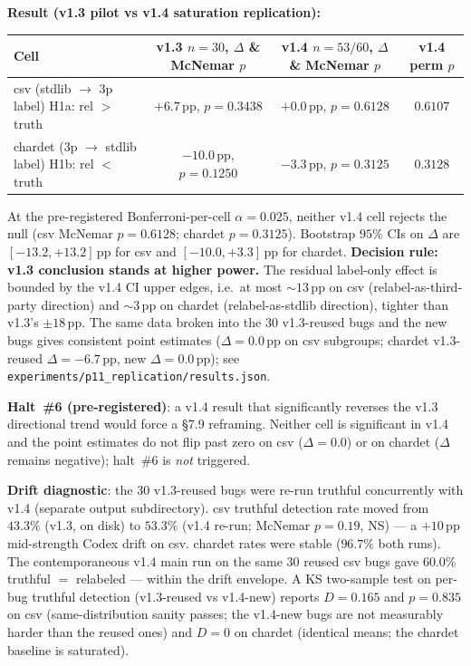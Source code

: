 \textbf{Result (v1.3 pilot vs v1.4 saturation replication):}

\begin{center}
\small
\begin{tabular}{@{}lccc@{}}
\toprule
Cell & v1.3 $n=30$, $\Delta$ \& McNemar $p$ & v1.4 $n=53/60$, $\Delta$ \& McNemar $p$ & v1.4 perm $p$ \\
\midrule
csv (stdlib $\to$ 3p label) H1a: rel $>$ truth & $+6.7\,\mathrm{pp}$, $p=0.3438$ & $+0.0\,\mathrm{pp}$, $p=0.6128$ & $0.6107$ \\
chardet (3p $\to$ stdlib label) H1b: rel $<$ truth & $-10.0\,\mathrm{pp}$, $p=0.1250$ & $-3.3\,\mathrm{pp}$, $p=0.3125$ & $0.3128$ \\
\bottomrule
\end{tabular}
\end{center}

At the pre-registered Bonferroni-per-cell $\alpha=0.025$, neither v1.4 cell rejects the null (csv McNemar $p=0.6128$; chardet $p=0.3125$). Bootstrap $95\%$ CIs on $\Delta$ are $[-13.2, +13.2]\,\mathrm{pp}$ for csv and $[-10.0, +3.3]\,\mathrm{pp}$ for chardet. \textbf{Decision rule: v1.3 conclusion stands at higher power.} The residual label-only effect is bounded by the v1.4 CI upper edges, i.e.\ at most $\sim 13\,\mathrm{pp}$ on csv (relabel-as-third-party direction) and $\sim 3\,\mathrm{pp}$ on chardet (relabel-as-stdlib direction), tighter than v1.3's $\pm 18\,\mathrm{pp}$. The same data broken into the $30$ v1.3-reused bugs and the new bugs gives consistent point estimates ($\Delta=0.0\,\mathrm{pp}$ on csv subgroups; chardet v1.3-reused $\Delta=-6.7\,\mathrm{pp}$, new $\Delta=0.0\,\mathrm{pp}$); see \texttt{experiments/p11\_replication/results.json}.

\textbf{Halt~\#6 (pre-registered)}: a v1.4 result that significantly reverses the v1.3 directional trend would force a §7.9 reframing. Neither cell is significant in v1.4 and the point estimates do not flip past zero on csv ($\Delta = 0.0$) or on chardet ($\Delta$ remains negative); halt~\#6 is \emph{not} triggered.

\textbf{Drift diagnostic}: the 30 v1.3-reused bugs were re-run truthful concurrently with v1.4 (separate output subdirectory). csv truthful detection rate moved from $43.3\%$ (v1.3, on disk) to $53.3\%$ (v1.4 re-run; McNemar $p=0.19$, NS) — a $+10\,\mathrm{pp}$ mid-strength Codex drift on csv. chardet rates were stable ($96.7\%$ both runs). The contemporaneous v1.4 main run on the same 30 reused csv bugs gave $60.0\%$ truthful $=$ relabeled — within the drift envelope. A KS two-sample test on per-bug truthful detection (v1.3-reused vs v1.4-new) reports $D=0.165$ and $p=0.835$ on csv (same-distribution sanity passes; the v1.4-new bugs are not measurably harder than the reused ones) and $D=0$ on chardet (identical means; the chardet baseline is saturated).


